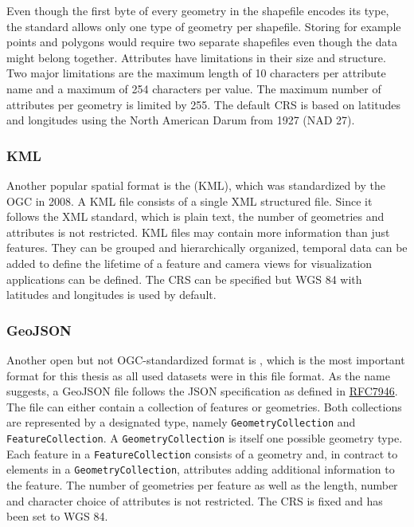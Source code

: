 			Even though the first byte of every geometry in the shapefile encodes its type, the standard allows only one type of geometry per shapefile\cite{esri-shapefile-spec}.
			Storing for example points and polygons would require two separate shapefiles even though the data might belong together.
			Attributes have limitations in their size and structure.
			Two major limitations are the maximum length of 10 characters per attribute name and a maximum of 254 characters per value\cite{esri-shapefile-limitations}.
			The maximum number of attributes per geometry is limited by 255.
			The default CRS is based on latitudes and longitudes using the North American Darum from 1927 (NAD 27)\cite{esri-shapefile-coordinate-system}.
			
		\subsubsection{KML}
		
			Another popular spatial format is the  (KML), which was standardized by the OGC in 2008\cite{ogc-kml-2.2}.
			A KML file consists of a single XML structured file.
			Since it follows the XML standard, which is plain text, the number of geometries and attributes is not restricted.
			KML files may contain more information than just features.
			They can be grouped and hierarchically organized, temporal data can be added to define the lifetime of a feature and camera views for visualization applications can be defined\cite{ogc-kml-2.3}.
			The CRS can be specified but WGS 84 with latitudes and longitudes is used by default.
		
		\subsubsection{GeoJSON}
		\label{subsubsec:geojson}
		
			Another open but not OGC-standardized format is , which is the most important format for this thesis as all used datasets were in this file format.
			As the name suggests, a GeoJSON file follows the JSON specification as defined in \href{https://datatracker.ietf.org/doc/html/rfc7946}{RFC7946}\cite{ietf-geojson}.
			The file can either contain a collection of features or geometries.
			Both collections are represented by a designated type, namely \texttt{GeometryCollection} and \texttt{FeatureCollection}.
			A \texttt{GeometryCollection} is itself one possible geometry type.
			Each feature in a \texttt{FeatureCollection} consists of a geometry and, in contract to elements in a \texttt{GeometryCollection}, attributes adding additional information to the feature.
			The number of geometries per feature as well as the length, number and character choice of attributes is not restricted.
			The CRS is fixed and has been set to WGS 84.
			

